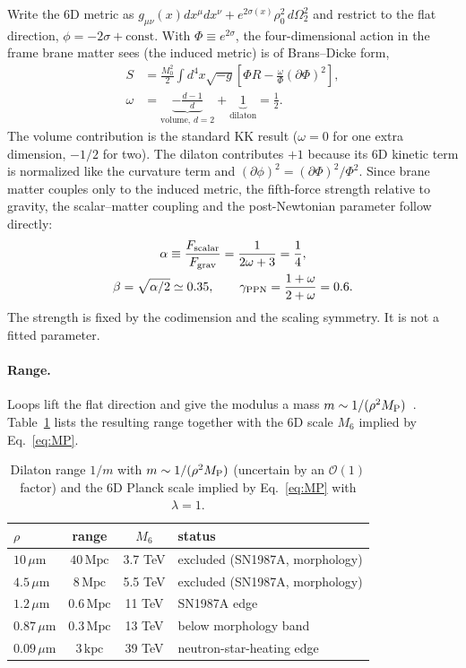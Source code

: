 \documentclass[aps,prd,reprint,superscriptaddress,nofootinbib,floatfix]{revtex4-2}
\theoremstyle{definition}
\newcommand{\MP}{M_{\rm P}}
\newcommand{\Mpc}{\,\mathrm{Mpc}}
\newcommand{\um}{\,\mu\mathrm{m}}
\begin{document}
Write the 6D metric as $g_{\mu\nu}(x)dx^\mu dx^\nu + e^{2\sigma(x)}\rho_0^2\,d\Omega_2^2$ and restrict to the flat direction, $\phi=-2\sigma+\text{const}$. With $\Phi\equiv e^{2\sigma}$, the four-dimensional action in the frame brane matter sees (the induced metric) is of Brans--Dicke form,
\begin{align}
S &= \frac{M_0^2}{2}\int d^4x\sqrt{-g}\left[\Phi R - \frac{\omega}{\Phi}(\partial\Phi)^2\right], \nonumber\\
\omega &= \underbrace{-\tfrac{d-1}{d}}_{\text{volume},\,d=2}+\underbrace{1}_{\text{dilaton}} = \tfrac12 . \label{eq:omega}
\end{align}
The volume contribution is the standard KK result ($\omega=0$ for one extra dimension, $-1/2$ for two). The dilaton contributes $+1$ because its 6D kinetic term is normalized like the curvature term and $(\partial\phi)^2=(\partial\Phi)^2/\Phi^2$. Since brane matter couples only to the induced metric, the fifth-force strength relative to gravity, the scalar--matter coupling and the post-Newtonian parameter follow directly:
\begin{gather}
\alpha \equiv \frac{F_{\rm scalar}}{F_{\rm grav}}=\frac{1}{2\omega+3}=\frac14, \label{eq:alpha}\\
\beta=\sqrt{\alpha/2}\simeq0.35,\qquad
\gamma_{\rm PPN}=\frac{1+\omega}{2+\omega}=0.6 . \nonumber
\end{gather}
The strength is fixed by the codimension and the scaling symmetry. It is not a fitted parameter.

\paragraph*{Range.} Loops lift the flat direction and give the modulus a mass $m\sim1/(\rho^2\MP)$~\cite{ABRS2001}. Table~\ref{tab:range} lists the resulting range together with the 6D scale $M_6$ implied by Eq.~\eqref{eq:MP}.

\begin{table}[t]
\caption{Dilaton range $1/m$ with $m\sim1/(\rho^2\MP)$ (uncertain by an $\mathcal{O}(1)$ factor) and the 6D Planck scale implied by Eq.~\eqref{eq:MP} with $\lambda=1$.}
\label{tab:range}
\begin{ruledtabular}
\begin{tabular}{lccl}
$\rho$ & range & $M_6$ & status \\
\hline
$10\um$ & $40\Mpc$ & 3.7 TeV & excluded (SN1987A, morphology)\\
$4.5\um$ & $8\Mpc$ & 5.5 TeV & excluded (SN1987A, morphology)\\
$1.2\um$ & $0.6\Mpc$ & 11 TeV & SN1987A edge\\
$0.87\um$ & $0.3\Mpc$ & 13 TeV & below morphology band\\
$0.09\um$ & $3\,\mathrm{kpc}$ & 39 TeV & neutron-star-heating edge\\
\end{tabular}
\end{ruledtabular}
\end{table}
\end{document}
